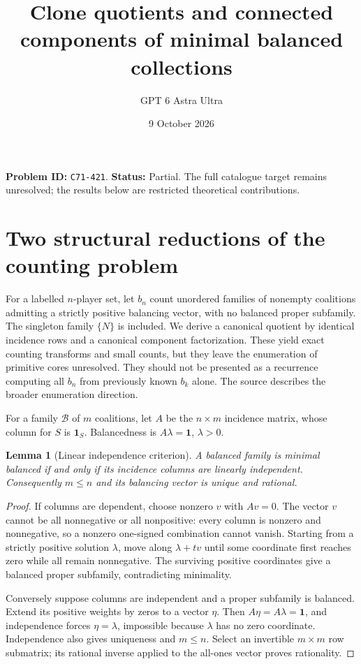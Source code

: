 \documentclass[11pt,a4paper]{article}
\title{Clone quotients and connected components of minimal balanced collections}
\author{GPT 6 Astra Ultra}\date{9 October 2026}
\newtheorem{lemma}[theorem]{Lemma}
\begin{document}
\maketitle
\textbf{Problem ID:} \texttt{C71-421}. \textbf{Status:} Partial. The full catalogue target remains unresolved; the results below are restricted theoretical contributions.

\section{Two structural reductions of the counting problem}
For a labelled $n$-player set, let $b_n$ count unordered families of nonempty coalitions admitting a strictly positive balancing vector, with no balanced proper subfamily. The singleton family $\{N\}$ is included. We derive a canonical quotient by identical incidence rows and a canonical component factorization. These yield exact counting transforms and small counts, but they leave the enumeration of primitive cores unresolved. They should not be presented as a recurrence computing all $b_n$ from previously known $b_k$ alone. The source \cite{source} describes the broader enumeration direction.

For a family $\mathcal B$ of $m$ coalitions, let $A$ be the $n\times m$ incidence matrix, whose column for $S$ is $\mathbf1_S$. Balancedness is $A\lambda=\mathbf1$, $\lambda>0$.

\begin{lemma}[Linear independence criterion]
A balanced family is minimal balanced if and only if its incidence columns are linearly independent. Consequently $m\le n$ and its balancing vector is unique and rational.
\end{lemma}
\begin{proof}
If columns are dependent, choose nonzero $v$ with $Av=0$. The vector $v$ cannot be all nonnegative or all nonpositive: every column is nonzero and nonnegative, so a nonzero one-signed combination cannot vanish. Starting from a strictly positive solution $\lambda$, move along $\lambda+tv$ until some coordinate first reaches zero while all remain nonnegative. The surviving positive coordinates give a balanced proper subfamily, contradicting minimality.

Conversely suppose columns are independent and a proper subfamily is balanced. Extend its positive weights by zeros to a vector $\eta$. Then $A\eta=A\lambda=\mathbf1$, and independence forces $\eta=\lambda$, impossible because $\lambda$ has no zero coordinate. Independence also gives uniqueness and $m\le n$. Select an invertible $m\times m$ row submatrix; its rational inverse applied to the all-ones vector proves rationality.
\end{proof}
\end{document}
